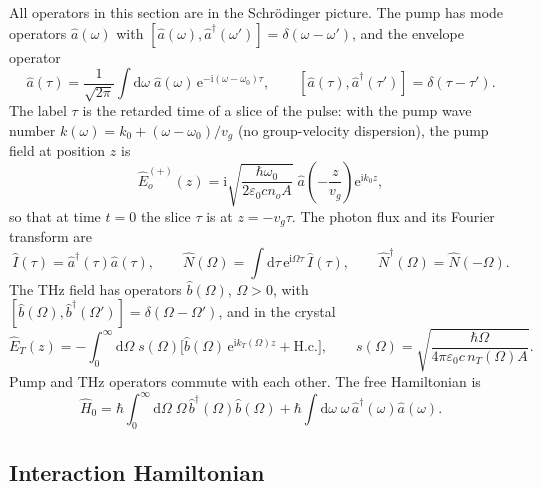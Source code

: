 \documentclass[aps,pra,onecolumn,notitlepage,11pt,amsmath,amssymb,nofootinbib]{revtex4-2}
\newcommand{\Nop}{\hat N}
\newcommand{\Iop}{\hat I}
\newcommand{\dd}{\mathrm{d}}
\newcommand{\ee}{\mathrm{e}}
\newcommand{\ii}{\mathrm{i}}
\begin{document}
All operators in this section are in the Schr\"odinger picture. The pump has
mode operators $\hat a(\omega)$ with
$[\hat a(\omega),\hat a^\dagger(\omega')]=\delta(\omega-\omega')$, and the
envelope operator
\begin{equation}
\hat a(\tau)=\frac{1}{\sqrt{2\pi}}\int\!\dd\omega\;\hat a(\omega)\,\ee^{-\ii(\omega-\omega_0)\tau},
\qquad[\hat a(\tau),\hat a^\dagger(\tau')]=\delta(\tau-\tau').
\label{eq:env}
\end{equation}
The label $\tau$ is the retarded time of a slice of the pulse: with the pump
wave number $k(\omega)=k_0+(\omega-\omega_0)/v_g$ (no group-velocity
dispersion), the pump field at position $z$ is
\begin{equation}
\hat E_o^{(+)}(z)=\ii\sqrt{\frac{\hbar\omega_0}{2\varepsilon_0cn_oA}}\;
\hat a\!\left(-\frac{z}{v_g}\right)\ee^{\ii k_0z},
\label{eq:Eo}
\end{equation}
so that at time $t=0$ the slice $\tau$ is at $z=-v_g\tau$. The photon flux and
its Fourier transform are
\begin{equation}
\Iop(\tau)=\hat a^\dagger(\tau)\hat a(\tau),\qquad
\Nop(\Omega)=\int\!\dd\tau\,\ee^{\ii\Omega\tau}\,\Iop(\tau),\qquad
\Nop^\dagger(\Omega)=\Nop(-\Omega).
\label{eq:Ndef}
\end{equation}
The THz field has operators $\hat b(\Omega)$, $\Omega>0$, with
$[\hat b(\Omega),\hat b^\dagger(\Omega')]=\delta(\Omega-\Omega')$, and in the
crystal
\begin{equation}
\hat E_T(z)=-\int_0^\infty\!\!\dd\Omega\;s(\Omega)\Big[\hat b(\Omega)\,\ee^{\ii k_T(\Omega)z}
+\mathrm{H.c.}\Big],\qquad
s(\Omega)=\sqrt{\frac{\hbar\Omega}{4\pi\varepsilon_0c\,n_T(\Omega)A}} .
\label{eq:ET}
\end{equation}
Pump and THz operators commute with each other. The free Hamiltonian is
\begin{equation}
\hat H_0=\hbar\int_0^\infty\!\!\dd\Omega\;\Omega\,\hat b^\dagger(\Omega)\hat b(\Omega)
+\hbar\int\!\dd\omega\;\omega\,\hat a^\dagger(\omega)\hat a(\omega).
\label{eq:H0}
\end{equation}

\subsection{Interaction Hamiltonian}
\end{document}
